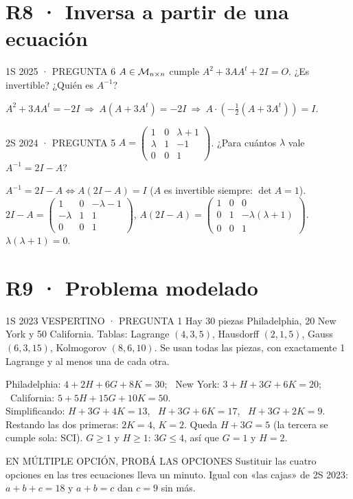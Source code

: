 \section*{R8 · Inversa a partir de una ecuación}
\begin{enunciado}{1S 2025 · PREGUNTA 6}
$A\in\mathcal{M}_{n\times n}$ cumple $A^2+3AA^t+2I=O$. ¿Es invertible? ¿Quién es $A^{-1}$?
\end{enunciado}
$A^2+3AA^t=-2I\ \Rightarrow\ A(A+3A^t)=-2I\ \Rightarrow\ A\cdot\left(-\tfrac12(A+3A^t)\right)=I$.
\begin{enunciado}{2S 2024 · PREGUNTA 5}
$A=\begin{pmatrix}1&0&\lambda+1\\\lambda&1&-1\\0&0&1\end{pmatrix}$. ¿Para cuántos $\lambda$ vale $A^{-1}=2I-A$?
\end{enunciado}
$A^{-1}=2I-A\iff A(2I-A)=I$ ($A$ es invertible siempre: $\det A=1$).
$2I-A=\begin{pmatrix}1&0&-\lambda-1\\-\lambda&1&1\\0&0&1\end{pmatrix}$, \quad $A(2I-A)=\begin{pmatrix}1&0&0\\0&1&-\lambda(\lambda+1)\\0&0&1\end{pmatrix}$.
$\lambda(\lambda+1)=0$.

\section*{R9 · Problema modelado}
\begin{enunciado}{1S 2023 VESPERTINO · PREGUNTA 1}
Hay 30 piezas Philadelphia, 20 New York y 50 California. Tablas: Lagrange $(4,3,5)$, Hausdorff $(2,1,5)$, Gauss $(6,3,15)$, Kolmogorov $(8,6,10)$. Se usan todas las piezas, con exactamente 1 Lagrange y al menos una de cada otra.
\end{enunciado}
Philadelphia: $4+2H+6G+8K=30$; \ New York: $3+H+3G+6K=20$; \ California: $5+5H+15G+10K=50$.\\
Simplificando: $H+3G+4K=13$, \ $H+3G+6K=17$, \ $H+3G+2K=9$.
Restando las dos primeras: $2K=4$, $K=2$. Queda $H+3G=5$ (la tercera se cumple sola: SCI).
$G\ge1$ y $H\ge1$: $3G\le4$, así que $G=1$ y $H=2$.
\begin{tip}{EN MÚLTIPLE OPCIÓN, PROBÁ LAS OPCIONES}
Sustituir las cuatro opciones en las tres ecuaciones lleva un minuto. Igual con «las cajas» de 2S 2023: $a+b+c=18$ y $a+b=c$ dan $c=9$ sin más.
\end{tip}

